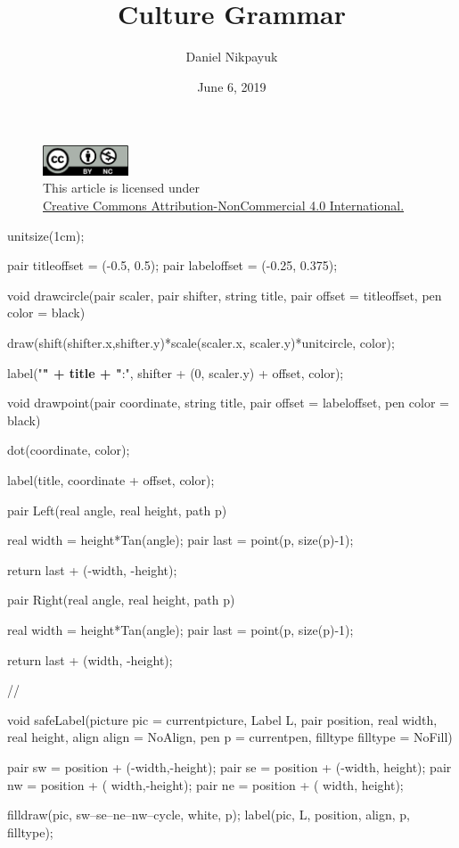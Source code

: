 \documentclass[twoside]{article}
\title{Culture Grammar}
\author{Daniel Nikpayuk}
\date{June 6, 2019}
\begin{document}
\maketitle
\thispagestyle{empty}

\begin{figure}[h]
\centering
\includegraphics[width=1in]{../../../cc-by-nc.png}\\[0.1in]
\tiny This article is licensed under \\
\href{http://creativecommons.org/licenses/by-nc/4.0/}
{Creative Commons Attribution-NonCommercial 4.0 International.}\\[0.3in]
\end{figure}

\begin{asydef}
unitsize(1cm);

pair titleoffset = (-0.5, 0.5);
pair labeloffset = (-0.25, 0.375);

void drawcircle(pair scaler, pair shifter, string title, pair offset = titleoffset, pen color = black)
{
	draw(shift(shifter.x,shifter.y)*scale(scaler.x, scaler.y)*unitcircle, color);

	label("{\bfseries " + title + "}:", shifter + (0, scaler.y) + offset, color);
}

void drawpoint(pair coordinate, string title, pair offset = labeloffset, pen color = black)
{
	dot(coordinate, color);

	label(title, coordinate + offset, color);
}

pair Left(real angle, real height, path p)
{
	real width = height*Tan(angle);
	pair last  = point(p, size(p)-1);

	return last + (-width, -height);
}

pair Right(real angle, real height, path p)
{
	real width = height*Tan(angle);
	pair last  = point(p, size(p)-1);

	return last + (width, -height);
}

//

void safeLabel(picture pic = currentpicture, Label L, pair position, real width, real height,
		align align = NoAlign, pen p = currentpen, filltype filltype = NoFill)
{
	pair sw = position + (-width,-height);
	pair se = position + (-width, height);
	pair nw = position + ( width,-height);
	pair ne = position + ( width, height);

	filldraw(pic, sw--se--ne--nw--cycle, white, p);
	label(pic, L, position, align, p, filltype);
}

\end{asydef}
\end{document}
